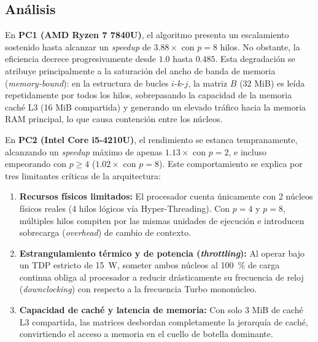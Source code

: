 \subsection{Análisis}
En \textbf{PC1 (AMD Ryzen 7 7840U)}, el algoritmo presenta un escalamiento sostenido hasta alcanzar un \emph{speedup} de $3.88\times$ con $p=8$ hilos. No obstante, la eficiencia decrece progresivamente desde $1.0$ hasta $0.485$. Esta degradación se atribuye principalmente a la saturación del ancho de banda de memoria (\emph{memory-bound}): en la estructura de bucles $i$-$k$-$j$, la matriz $B$ ($32$ MiB) es leída repetidamente por todos los hilos, sobrepasando la capacidad de la memoria caché L3 (16 MiB compartida) y generando un elevado tráfico hacia la memoria RAM principal, lo que causa contención entre los núcleos.

En \textbf{PC2 (Intel Core i5-4210U)}, el rendimiento se estanca tempranamente, alcanzando un \emph{speedup} máximo de apenas $1.13\times$ con $p=2$, e incluso empeorando con $p \ge 4$ ($1.02\times$ con $p=8$). Este comportamiento se explica por tres limitantes críticas de la arquitectura:
\begin{enumerate}
    \item \textbf{Recursos físicos limitados:} El procesador cuenta únicamente con 2 núcleos físicos reales (4 hilos lógicos vía Hyper-Threading). Con $p=4$ y $p=8$, múltiples hilos compiten por las mismas unidades de ejecución e introducen sobrecarga (\emph{overhead}) de cambio de contexto.
    \item \textbf{Estrangulamiento térmico y de potencia (\emph{throttling}):} Al operar bajo un TDP estricto de \SI{15}{\watt}, someter ambos núcleos al \SI{100}{\percent} de carga continua obliga al procesador a reducir drásticamente su frecuencia de reloj (\emph{downclocking}) con respecto a la frecuencia Turbo mononúcleo.
    \item \textbf{Capacidad de caché y latencia de memoria:} Con solo 3 MiB de caché L3 compartida, las matrices desbordan completamente la jerarquía de caché, convirtiendo el acceso a memoria en el cuello de botella dominante.
\end{enumerate}
